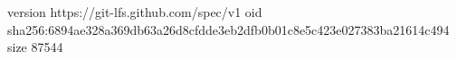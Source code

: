 version https://git-lfs.github.com/spec/v1
oid sha256:6894ae328a369db63a26d8cfdde3eb2dfb0b01c8e5c423e027383ba21614c494
size 87544
